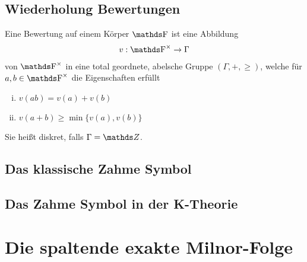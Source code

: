 \documentclass[ngerman,fontsize=11pt, paper=a4, parskip=half, titlepage=true, toc=bib]{scrartcl}
\begin{document}
\subsection{Wiederholung Bewertungen}
\begin{Def}[Bewertungsabbildung]
Eine Bewertung auf einem Körper $\F$ ist eine Abbildung
\begin{gather*}
  v:\Fx\to \Gamma
\end{gather*}
von $\Fx$ in eine total geordnete, abelsche Gruppe $(\Gamma, +,\geq)$,
welche für $a,b\in\Fx$ die Eigenschaften erfüllt
\begin{enumerate}[i)]
\item $v(ab)=v(a)+v(b)$
\item $v(a+b)\geq \min\{v(a),v(b)\}$
\end{enumerate}
Sie heißt diskret, falls $\Gamma=\Z$.
\end{Def}

\begin{Def}\end{Def}

\subsection{Das klassische Zahme Symbol}
\begin{Def}\end{Def}

\subsection{Das Zahme Symbol in der K-Theorie}
\begin{Satz}\end{Satz}


\section{Die spaltende exakte Milnor-Folge}
\cite[][Theorem 2.3]{milnor}

\printindex

\nocite{*}
\printbibliography
\end{document}
